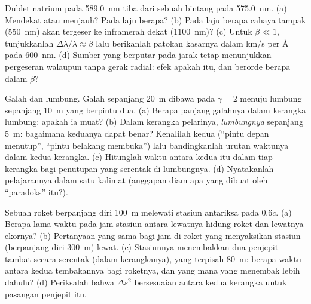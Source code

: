 \begin{exercise}[$\star\star$]\label{exo:b3:relativistic-kinematics:7}
Dublet natrium pada \qty{589.0}{nm} tiba dari sebuah bintang pada
\qty{575.0}{nm}. (a) Mendekat atau menjauh? Pada laju berapa? (b) Pada
laju berapa cahaya tampak (\qty{550}{nm}) akan tergeser ke inframerah
dekat (\qty{1100}{nm})? (c) Untuk $\beta \ll 1$, tunjukkanlah
$\Delta\lambda/\lambda \approx \beta$ lalu berikanlah patokan kasarnya
dalam km/s per \unit{\angstrom} pada \qty{600}{nm}. (d) Sumber yang
berputar pada jarak tetap menunjukkan pergeseran walaupun tanpa gerak
radial: efek apakah itu, dan berorde berapa dalam $\beta$?
\end{exercise}

\begin{exercise}[$\star\star$]\label{exo:b3:relativistic-kinematics:8}
Galah dan lumbung. Galah sepanjang \qty{20}{m} dibawa pada $\gamma = 2$
menuju lumbung sepanjang \qty{10}{m} yang berpintu dua. (a) Berapa
panjang galahnya dalam kerangka lumbung: apakah ia muat? (b) Dalam
kerangka pelarinya, \emph{lumbungnya} sepanjang \qty{5}{m}: bagaimana
keduanya dapat benar? Kenalilah kedua  (``pintu depan
menutup'', ``pintu belakang membuka'') lalu bandingkanlah urutan waktunya
dalam kedua kerangka. (c) Hitunglah waktu antara kedua  itu
dalam tiap kerangka bagi penutupan yang serentak di lumbungnya. (d)
Nyatakanlah pelajarannya dalam satu kalimat (anggapan diam apa yang
dibuat oleh ``paradoks'' itu?).
\end{exercise}

\begin{exercise}[$\star\star$]\label{exo:b3:relativistic-kinematics:9}
Sebuah roket berpanjang diri \qty{100}{m} melewati stasiun antariksa
pada $0.6c$. (a) Berapa lama waktu pada jam stasiun antara lewatnya
hidung roket dan lewatnya ekornya? (b) Pertanyaan yang sama bagi jam di
roket yang menyaksikan stasiun (berpanjang diri \qty{300}{m}) lewat. (c)
Stasiunnya menembakkan dua penjepit tambat secara serentak (dalam
kerangkanya), yang terpisah \qty{80}{m}: berapa waktu antara kedua
tembakannya bagi roketnya, dan yang mana yang menembak lebih dahulu? (d)
Periksalah bahwa $\Delta s^2$ bersesuaian antara kedua kerangka untuk
pasangan  penjepit itu.
\end{exercise}

